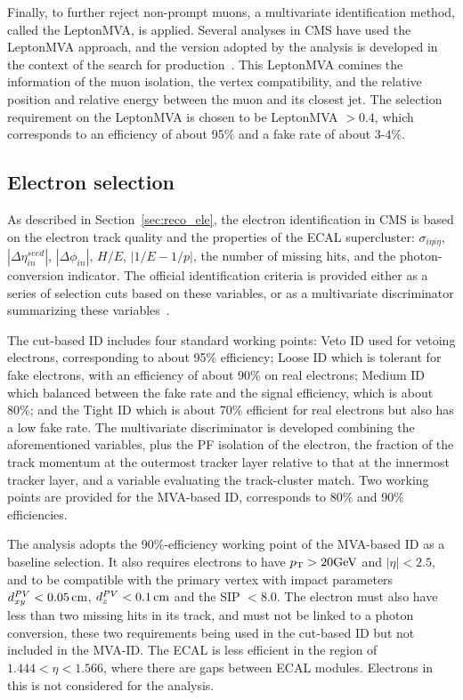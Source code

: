 Finally, to further reject non-prompt muons, a multivariate identification method, called the LeptonMVA, is applied.
Several analyses in CMS have used the LeptonMVA approach, and the version adopted by the \hmm analysis is developed in 
the context of the search for \tZq production~\cite{PhysRevLett.122.132003}.
This LeptonMVA comines the information of the muon isolation, the vertex compatibility, and the relative position and relative energy between the muon and its closest jet.
The selection requirement on the LeptonMVA is chosen to be LeptonMVA $> 0.4$, 
which corresponds to an efficiency of about 95\% and a fake rate of about 3-4\%. 

\subsection{Electron selection}\label{sec:sel_ele}

As described in Section~\ref{sec:reco_ele}, 
the electron identification in CMS is based on the electron track quality and the properties of the ECAL supercluster:
$\sigma_{i\eta{}i\eta}$,  $|\Delta\eta^{seed}_{in}|$, $|\Delta\phi_{in}|$, $H/E$, $|1/E-1/p|$, the number of missing hits, and the photon-conversion indicator. 
The official identification criteria is provided either as a series of selection cuts based on these variables, 
or as a multivariate discriminator summarizing these variables~\cite{cmscollaboration2020electron}.

The cut-based ID includes four standard working points: 
Veto ID used for vetoing electrons, corresponding to about 95\% efficiency;
Loose ID which is tolerant for fake electrons, with an efficiency of about 90\% on real electrons;
Medium ID which balanced between the fake rate and the signal efficiency, which is about 80\%;
and the Tight ID which is about 70\% efficient for real electrons but also has a low fake rate.
The multivariate discriminator is developed combining the aforementioned variables, 
plus the PF isolation of the electron, the fraction of the track momentum at the outermost tracker layer relative to that at the innermost tracker layer, 
and a variable evaluating the track-cluster match.
Two working points are provided for the MVA-based ID, corresponds to 80\% and 90\% efficiencies.

The \hmm analysis adopts the 90\%-efficiency working point of the MVA-based ID as a baseline selection.
It also requires electrons to have $p_{\mathrm{T}} > 20 \mbox{GeV}$ and $|\eta| < 2.5$, 
and to be compatible with the primary vertex with impact parameters
$d^{PV}_{xy} < 0.05 \,\text{cm}$, $d^{PV}_{z} < 0.1 \,\text{cm}$ and the SIP $< 8.0$. 
The electron must also have less than two missing hits in its track, and must not be linked to a photon conversion,
these two requirements being used in the cut-based ID but not included in the MVA-ID.
The ECAL is less efficient in the region of $1.444 < \eta < 1.566$, where there are gaps between ECAL modules.
Electrons in this is not considered for the analysis.

